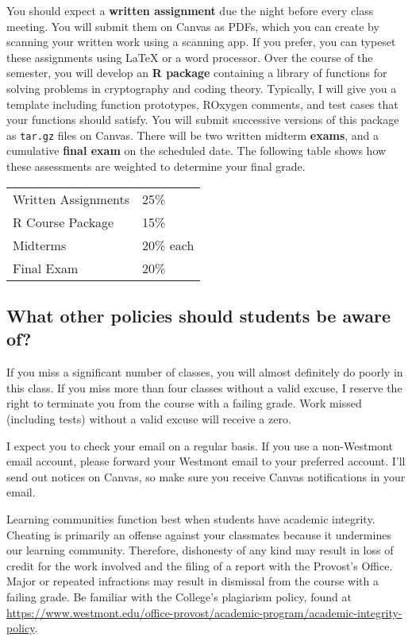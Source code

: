 \documentclass[
  twoside]{article}
\begin{document}
You should expect a \textbf{written assignment} due the night before
every class meeting. You will submit them on Canvas as PDFs, which you
can create by scanning your written work using a scanning app. If you
prefer, you can typeset these assignments using LaTeX or a word
processor. Over the course of the semester, you will develop an
\textbf{R package} containing a library of functions for solving
problems in cryptography and coding theory. Typically, I will give you a
template including function prototypes, ROxygen comments, and test cases
that your functions should satisfy. You will submit successive versions
of this package as \texttt{tar.gz} files on Canvas. There will be two
written midterm \textbf{exams}, and a cumulative \textbf{final exam} on
the scheduled date. The following table shows how these assessments are
weighted to determine your final grade.

\begin{tabular}[t]{ll}
\toprule
Written Assignments & 25\%\\
R Course Package & 15\%\\
Midterms & 20\% each\\
Final Exam & 20\%\\
\bottomrule
\end{tabular}

\hypertarget{what-other-policies-should-students-be-aware-of}{%
\subsection{What other policies should students be aware
of?}\label{what-other-policies-should-students-be-aware-of}}

If you miss a significant number of classes, you will almost definitely
do poorly in this class. If you miss more than four classes without a
valid excuse, I reserve the right to terminate you from the course with
a failing grade. Work missed (including tests) without a valid excuse
will receive a zero.

I expect you to check your email on a regular basis. If you use a
non-Westmont email account, please forward your Westmont email to your
preferred account. I'll send out notices on Canvas, so make sure you
receive Canvas notifications in your email.

Learning communities function best when students have academic
integrity. Cheating is primarily an offense against your classmates
because it undermines our learning community. Therefore, dishonesty of
any kind may result in loss of credit for the work involved and the
filing of a report with the Provost's Office. Major or repeated
infractions may result in dismissal from the course with a failing
grade. Be familiar with the College's plagiarism policy, found at
\url{https://www.westmont.edu/office-provost/academic-program/academic-integrity-policy}.
\end{document}
